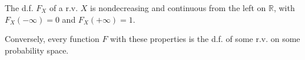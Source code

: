 The d.f. $F_X$ of a r.v. $X$ is nondecreasing and continuous from the left on $\mathbb{R}$, with $F_X(-\infty) = 0$ and $F_X(+\infty) = 1$.

Conversely, every function $F$ with these properties is the d.f. of some r.v. on some probability space.

